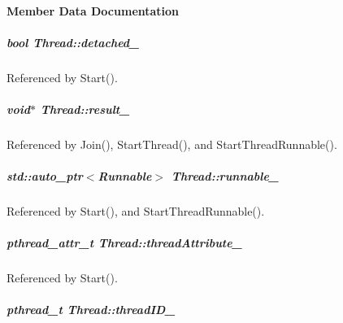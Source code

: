 \paragraph{Member Data Documentation}
\hypertarget{group___core_a2b6b46b7eb56cffef7d0722649956c5d}{
\subparagraph[{detached\-\_\-}]{\setlength{\rightskip}{0pt plus 5cm}bool Thread\-::detached\-\_\-\hspace{0.3cm}{\ttfamily [private]}}}\label{group___core_a2b6b46b7eb56cffef7d0722649956c5d}


Referenced by Start().

\hypertarget{group___core_a56c923629f0131b37a2b8c1f74a1e2b0}{
\subparagraph[{result\-\_\-}]{\setlength{\rightskip}{0pt plus 5cm}void$\ast$ Thread\-::result\-\_\-\hspace{0.3cm}{\ttfamily [private]}}}\label{group___core_a56c923629f0131b37a2b8c1f74a1e2b0}


Referenced by Join(), Start\-Thread(), and Start\-Thread\-Runnable().

\hypertarget{group___core_a4e2c7c71f666a7c4404f8fc03a57f2d7}{
\subparagraph[{runnable\-\_\-}]{\setlength{\rightskip}{0pt plus 5cm}std\-::auto\-\_\-ptr$<${\bf Runnable}$>$ Thread\-::runnable\-\_\-\hspace{0.3cm}{\ttfamily [private]}}}\label{group___core_a4e2c7c71f666a7c4404f8fc03a57f2d7}


Referenced by Start(), and Start\-Thread\-Runnable().

\hypertarget{group___core_a2fbeb3f285f074698a3323bfdd7e5d2a}{
\subparagraph[{thread\-Attribute\-\_\-}]{\setlength{\rightskip}{0pt plus 5cm}pthread\-\_\-attr\-\_\-t Thread\-::thread\-Attribute\-\_\-\hspace{0.3cm}{\ttfamily [private]}}}\label{group___core_a2fbeb3f285f074698a3323bfdd7e5d2a}


Referenced by Start().

\hypertarget{group___core_a8a7056f4641e224b016506ec0fc1078b}{
\subparagraph[{thread\-I\-D\-\_\-}]{\setlength{\rightskip}{0pt plus 5cm}pthread\-\_\-t Thread\-::thread\-I\-D\-\_\-\hspace{0.3cm}{\ttfamily [private]}}}\label{group___core_a8a7056f4641e224b016506ec0fc1078b}


